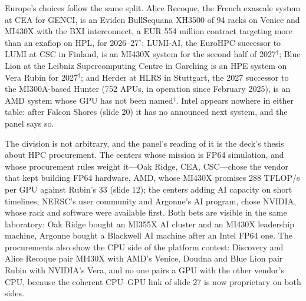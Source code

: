 \documentclass[11pt,letterpaper]{article}
\begin{document}
Europe's choices follow the same split. Alice Recoque, the French exascale system at CEA for GENCI, is an Eviden BullSequana XH3500 of 94 racks on Venice and MI430X with the BXI interconnect, a EUR 554 million contract targeting more than an exaflop on HPL, for 2026--27$^\dagger$; LUMI-AI, the EuroHPC successor to LUMI at CSC in Finland, is an MI430X system for the second half of 2027$^\dagger$; Blue Lion at the Leibniz Supercomputing Centre in Garching is an HPE system on Vera Rubin for 2027$^\dagger$; and Herder at HLRS in Stuttgart, the 2027 successor to the MI300A-based Hunter (752 APUs, in operation since February 2025), is an AMD system whose GPU has not been named$^\dagger$. Intel appears nowhere in either table: after Falcon Shores (slide 20) it has no announced next system, and the panel says so.

The division is not arbitrary, and the panel's reading of it is the deck's thesis about HPC procurement. The centers whose mission is FP64 simulation, and whose procurement rules weight it---Oak Ridge, CEA, CSC---chose the vendor that kept building FP64 hardware, AMD, whose MI430X promises 288 TFLOP/s per GPU against Rubin's 33 (slide 12); the centers adding AI capacity on short timelines, NERSC's user community and Argonne's AI program, chose NVIDIA, whose rack and software were available first. Both bets are visible in the same laboratory: Oak Ridge bought an MI355X AI cluster and an MI430X leadership machine, Argonne bought a Blackwell AI machine after an Intel FP64 one. The procurements also show the CPU side of the platform contest: Discovery and Alice Recoque pair MI430X with AMD's Venice, Doudna and Blue Lion pair Rubin with NVIDIA's Vera, and no one pairs a GPU with the other vendor's CPU, because the coherent CPU--GPU link of slide 27 is now proprietary on both sides.
\end{document}
